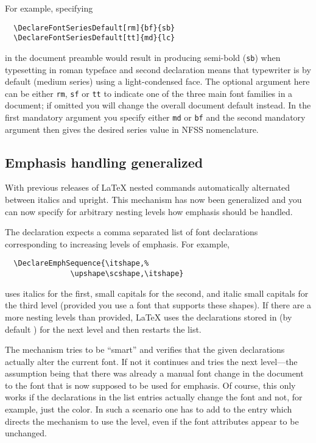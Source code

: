 \documentclass{ltnews}
\begin{document}
For example, specifying
\begin{verbatim}
  \DeclareFontSeriesDefault[rm]{bf}{sb}
  \DeclareFontSeriesDefault[tt]{md}{lc}
\end{verbatim}
in the document preamble would result in  producing
semi-bold (\texttt{sb}) when typesetting in roman typeface and second
declaration means that typewriter is by default (medium series) using
a light-condensed face. The optional argument here can be either
\texttt{rm}, \texttt{sf} or \texttt{tt} to indicate one of the three
main font families in a document; if omitted you will change the
overall document default instead.  In the first mandatory argument you
specify either \texttt{md} or \texttt{bf} and the second mandatory
argument then gives the desired series value in NFSS nomenclature.


\subsection{Emphasis handling generalized}

With previous releases of \LaTeX{} nested  commands
automatically alternated between italics and upright.  This mechanism
has now been generalized and you can now specify for arbitrary nesting
levels how emphasis should be handled.

The declaration  expects a comma separated
list of font declarations corresponding to increasing levels of
emphasis. For example,
\begin{verbatim}
  \DeclareEmphSequence{\itshape,%
               \upshape\scshape,\itshape}
\end{verbatim}
uses italics for the first, small capitals for the second, and italic
small capitals for the third level (provided you use a font that
supports these shapes).  If there are a more nesting levels than
provided, \LaTeX{} uses the declarations stored in  (by
default ) for the next level and then
restarts the list.

The mechanism tries to be \enquote{smart} and verifies that the given
declarations actually alter the current font. If not it continues and
tries the next level---the assumption being that there was already a
manual font change in the document to the font that is now supposed to
be used for emphasis.
%
Of course, this only works if the declarations in the list entries
actually change the font and not, for example, just the color. In such
a scenario one has to add  to the entry which directs the
mechanism to use the level, even if the font attributes appear to be
unchanged.
\end{document}
